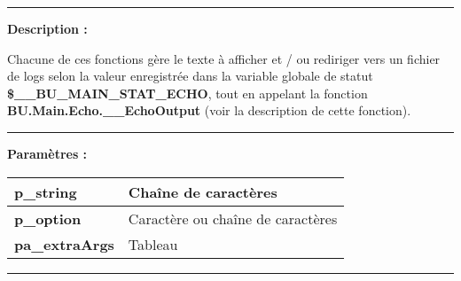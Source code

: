 \documentclass[a4paper,10pt]{article}
\begin{document}

\par\noindent\rule{\textwidth}{0.4pt}

\begin{justify}
    \textbf{Description :}

    Chacune de ces fonctions gère le texte à afficher et / ou rediriger vers un fichier de logs selon la valeur enregistrée dans la variable globale de statut \textbf{\color{vars}\$\_\_BU\_MAIN\_STAT\_ECHO}, tout en appelant la fonction \textbf{\color{func}BU.Main.Echo.\_\_EchoOutput} (voir la description de cette fonction).
\end{justify}


\par\noindent\rule{\textwidth}{0.4pt}

\begin{justify}
    \textbf{Paramètres :}

    \begin{tabular}{|l|l|}
        \hline
        \textbf{\color{vars}p\_string} & Chaîne de caractères\\
        \hline
        \textbf{\color{vars}p\_option} & Caractère ou chaîne de caractères\\
        \hline
        \textbf{\color{vars}pa\_extraArgs} & Tableau\\
        \hline
    \end{tabular}
\end{justify}

\setlength{\parskip}{2em}


\par\noindent\rule{\textwidth}{0.4pt}
\end{document}
